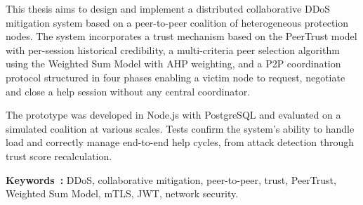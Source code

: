 This thesis aims to design and implement a distributed collaborative DDoS mitigation system based on a peer-to-peer coalition of heterogeneous protection nodes. The system incorporates a trust mechanism based on the PeerTrust model with per-session historical credibility, a multi-criteria peer selection algorithm using the Weighted Sum Model with AHP weighting, and a P2P coordination protocol structured in four phases enabling a victim node to request, negotiate and close a help session without any central coordinator.

The prototype was developed in Node.js with PostgreSQL and evaluated on a simulated coalition at various scales. Tests confirm the system's ability to handle load and correctly manage end-to-end help cycles, from attack detection through trust score recalculation.

\medskip
\noindent\textbf{Keywords~:} DDoS, collaborative mitigation, peer-to-peer, trust, PeerTrust, Weighted Sum Model, mTLS, JWT, network security.

\newpage
